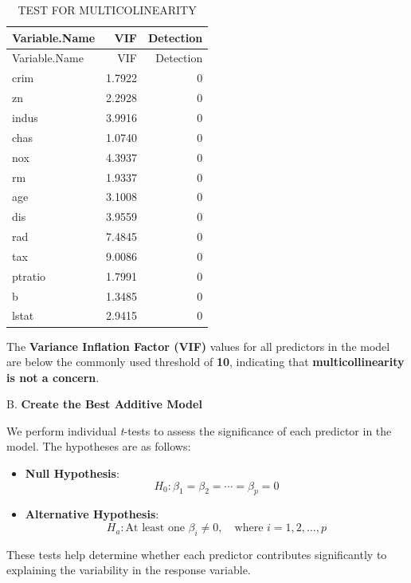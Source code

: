 \documentclass[
]{article}
\begin{document}
\begin{longtable}[]{@{}lrr@{}}
\caption{TEST FOR MULTICOLINEARITY}\tabularnewline
\toprule\noalign{}
Variable.Name & VIF & Detection \\
\midrule\noalign{}
\endfirsthead
\toprule\noalign{}
Variable.Name & VIF & Detection \\
\midrule\noalign{}
\endhead
\bottomrule\noalign{}
\endlastfoot
crim & 1.7922 & 0 \\
zn & 2.2928 & 0 \\
indus & 3.9916 & 0 \\
chas & 1.0740 & 0 \\
nox & 4.3937 & 0 \\
rm & 1.9337 & 0 \\
age & 3.1008 & 0 \\
dis & 3.9559 & 0 \\
rad & 7.4845 & 0 \\
tax & 9.0086 & 0 \\
ptratio & 1.7991 & 0 \\
b & 1.3485 & 0 \\
lstat & 2.9415 & 0 \\
\end{longtable}

The \textbf{Variance Inflation Factor (VIF)} values for all predictors
in the model are below the commonly used threshold of \textbf{10},
indicating that \textbf{multicollinearity is not a concern}.

B. \textbf{Create the Best Additive Model}

We perform individual \emph{t}-tests to assess the significance of each
predictor in the model. The hypotheses are as follows:

\begin{itemize}
\item
  \textbf{Null Hypothesis}:\\
  \[ H_0: \beta_1 = \beta_2 = \cdots = \beta_p = 0 \]
\item
  \textbf{Alternative Hypothesis}:\\
  \[ H_a: \text{At least one } \beta_i \ne 0, \quad \text{where } i = 1, 2, \ldots, p \]
\end{itemize}

These tests help determine whether each predictor contributes
significantly to explaining the variability in the response variable.
\end{document}
